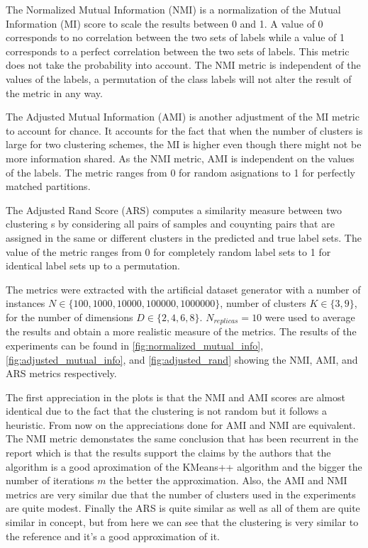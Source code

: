 The Normalized Mutual Information (NMI) is a normalization of the Mutual Information (MI) score to scale the results between 0 and 1. A value of 0 corresponds to no correlation between the two sets of labels while a value of 1 corresponds to a perfect correlation between the two sets of labels. This metric does not take the probability into account. The NMI metric is independent of the values of the labels, a permutation of the class labels will not alter the result of the metric in any way.

The Adjusted Mutual Information (AMI) is another adjustment of the MI metric to account for chance. It accounts for the fact that when the number of clusters is large for two clustering schemes, the MI is higher even though there might not be more information shared. As the NMI metric, AMI is independent on the values of the labels. The metric ranges from 0 for random asignations to 1 for perfectly matched partitions.

The Adjusted Rand Score (ARS) computes a similarity measure between two clustering s by considering all pairs of samples and couynting pairs that are assigned in the same or different clusters in the predicted and true label sets. The value of the metric ranges from 0 for completely random label sets to 1 for identical label sets up to a permutation.

The metrics were extracted with the artificial dataset generator with a number of instances $N \in \{100, 1000, 10000, 100000, 1000000\}$, number of clusters $K \in \{3, 9\}$, for the number of dimensions $D \in \{2, 4, 6, 8\}$. $N_{replicas}=10$ were used to average the results and obtain a more realistic measure of the metrics. The results of the experiments can be found in \ref{fig:normalized_mutual_info}, \ref{fig:adjusted_mutual_info}, and \ref{fig:adjusted_rand} showing the NMI, AMI, and ARS metrics respectively.

The first appreciation in the plots is that the NMI and AMI scores are almost identical due to the fact that the clustering is not random but it follows a heuristic. From now on the appreciations done for AMI and NMI are equivalent. The NMI metric demonstates the same conclusion that has been recurrent in the report which is that the results support the claims by the authors that the algorithm is a good aproximation of the KMeans++ algorithm and the bigger the number of iterations $m$ the better the approximation. Also, the AMI and NMI metrics are very similar due that the number of clusters used in the experiments are quite modest. Finally the ARS is quite similar as well as all of them are quite similar in concept, but from here we can see that the clustering is very similar to the reference and it's a good approximation of it.

